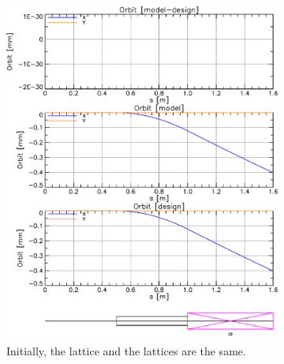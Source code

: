 \documentclass{hitec}
\begin{document}
\begin{figure}[tb]
  \centering
  \begin{subfigure}[b]{0.48\textwidth}
    \includegraphics[width=\textwidth]{model-equal-design.pdf}
    \caption{Initially, the  lattice and the  lattices are the same.}
    \label{f:model.eq.design}
  \end{subfigure}
  \hfil
  \begin{subfigure}[b]{0.48\textwidth}

\end{subfigure}
\end{figure}
\end{document}
